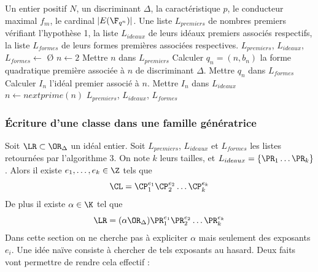 \begin{algorithm}
	\caption{Famille génératrice du groupe de classes}
	\begin{algorithmic}[1]
		\Require Un entier positif $N$, un discriminant $\Delta$, la caractéristique $p$, le conducteur maximal $f_{m}$, le cardinal $|E(\F_{q^{n}})|$.
		\Ensure Une liste $L_{premiers}$ de nombres premiers vérifiant l'hypothèse 1, la liste $L_{ideaux}$ de leurs idéaux premiers associés respectifs, la liste $L_{formes}$ de leurs formes premières associées respectives. 
		\State $L_{premiers}$, $L_{ideaux}$, $L_{formes} \gets$ \O
		\State $n \gets 2$
		\State Mettre $n$ dans $L_{premiers}$
		\State Calculer $q_{n} = (n ,b_{n})$ la forme quadratique première associée à $n$ de discriminant $\Delta$.
		\State Mettre $q_{n}$ dans $L_{formes}$
		\State Calculer $I_{n}$ l'idéal premier associé à $n$. 
		\State Mettre $I_{n}$ dans $L_{ideaux}$
		\EndIf
		\State $n \gets nextprime(n)$
		\EndWhile
		\State\Return $L_{premiers}$, $L_{ideaux}$, $L_{formes}$
	\end{algorithmic}
\end{algorithm}



\newpage





\subsubsection{Écriture d'une classe dans une famille génératrice}


Soit $\LR\subset\OR_{\Delta}$ un idéal entier. Soit $L_{premiers}$, $L_{ideaux}$ et $L_{formes}$ les listes retournées par l'algorithme $3$. On note $k$ leurs tailles, et $ L_{ideaux} = \left\lbrace \PR_{1}\ldots\PR_{k}\right\rbrace $. Alors il existe $e_{1},\ldots,e_{k}\in\Z$ tels que
\begin{equation*}
	\CL = \CP_{1}^{e_{1}}\CP_{2}^{e_{2}}\ldots\CP_{k}^{e_{k}}
\end{equation*}
De plus il existe $\alpha\in\K$ tel que
\begin{equation*}
	\LR = (\alpha\OR_{\Delta})\PR_{1}^{e_{1}}\PR_{2}^{e_{2}}\ldots\PR_{k}^{e_{k}}
\end{equation*}
Dans cette section on ne cherche pas à expliciter $\alpha$ mais seulement des exposants $e_{i}$. Une idée naïve consiste à chercher de tels exposants au hasard. Deux faits vont permettre de rendre cela effectif :

